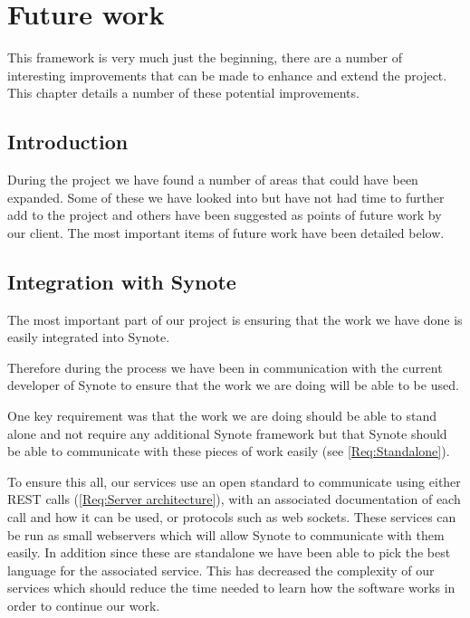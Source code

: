 \chapter{Future work} \label{Chapter: Future Work}

\begin{preamble}
This framework is very much just the beginning, there are a number of interesting improvements that can be made to enhance and extend the project. This chapter details a number of these potential improvements.
\end{preamble}

\section{Introduction}

During the project we have found a number of areas that could have been expanded. Some of these we have looked into but have not had time to further add to the project and others have been suggested as points of future work by our client. The most important items of future work have been detailed below.

\section{Integration with Synote}

The most important part of our project is ensuring that the work we have done is easily integrated into Synote.

Therefore during the process we have been in communication with the current developer of Synote to ensure that the work we are doing will be able to be used.

One key requirement was that the work we are doing should be able to stand alone and not require any additional Synote framework but that Synote should be able to communicate with these pieces of work easily (see \cref{Req:Standalone}).

To ensure this all, our services use an open standard to communicate using either \gls{REST} calls (\cref{Req:Server architecture}), with an associated documentation of each call and how it can be used, or protocols such as web sockets. These services can be run as small webservers which will allow Synote to communicate with them easily. In addition since these are standalone we have been able to pick the best language for the associated service. This has decreased the complexity of our services which should reduce the time needed to learn how the software works in order to continue our work.

